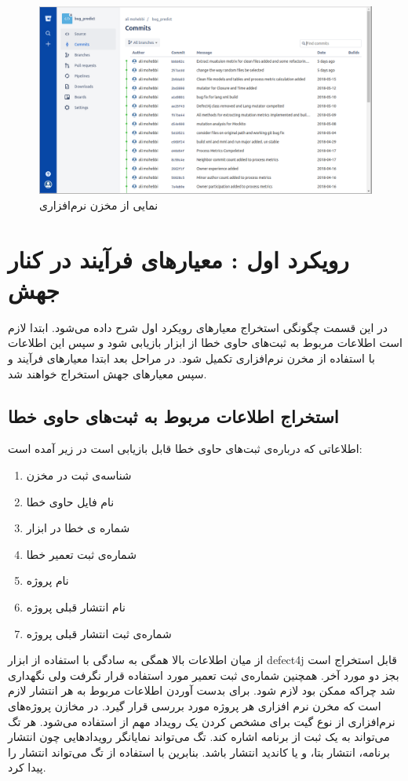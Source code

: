  \begin{figure}[H]
	\centering
	\includegraphics[width=1\textwidth]{img/case_study/bitbucket.png}
	\caption{نمایی از مخزن نرم‌افزاری}
	\label{fig:bitbucket}
\end{figure}



\section{رویکرد اول : معیارهای فرآیند در کنار جهش}
در این قسمت  چگونگی استخراج معیارهای رویکرد اول شرح داده می‌شود. ابتدا لازم است اطلاعات مربوط به ثبت‌های  حاوی خطا از ابزار  بازیابی شود و سپس این اطلاعات با استفاده از مخرن نرم‌افزاری تکمیل شود. در مراحل بعد ابتدا معیار‌های فرآیند و سپس معیارهای جهش استخراج خواهند شد. 

\subsection{ استخراج اطلاعات مربوط به ثبت‌های   حاوی خطا}
اطلاعاتی که درباره‌ی ثبت‌های حاوی خطا قابل بازیابی است در زیر آمده است:
\begin{enumerate}
\item شناسه‌ی ثبت در مخزن 
\item نام فایل حاوی خطا
\item شماره ی خطا در ابزار 
\item شماره‌ی ثبت تعمیر خطا
\item نام پروژه
\item نام انتشار قبلی پروژه
\item شماره‌ی ثبت انتشار قبلی پروژه
\end{enumerate}

از میان اطلاعات بالا همگی به سادگی با استفاده از ابزار defect4j قابل استخراج است بجز دو مورد آخر. همچنین شماره‌ی ثبت تعمیر مورد استفاده قرار نگرفت ولی نگهداری شد چراکه ممکن بود لازم شود. 
برای بدست آوردن اطلاعات مربوط به هر انتشار لازم است که مخرن نرم افزاری هر پروژه مورد بررسی قرار گیرد. در  مخازن پروژه‌های نرم‌افزاری  از نوع گیت برای مشخص کردن یک رویداد مهم از  استفاده می‌شود. هر تگ می‌تواند به یک ثبت از برنامه اشاره کند. تگ می‌تواند نمایانگر رویدادهایی چون انتشار برنامه، انتشار بتا، و یا کاندید انتشار باشد. بنابرین با استفاده از تگ می‌تواند انتشار را پیدا کرد.\\

